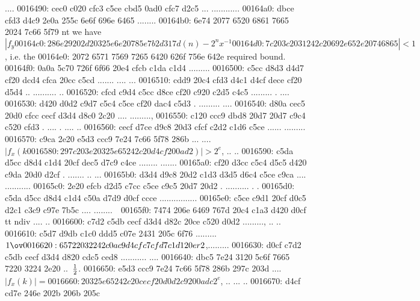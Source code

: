\begin{bo
00010e0: 7865 647d 5c62 6567 696e 7b76 6572 6261  xed}
\begin{verba
00010f0: 7469 6d7d 0a20 2023 7479 7065 2074 6572  tim}
\begin{
0001c40: 7665 7262 6174 696d 7d0a 2020 236c 6574  verbatim}
\begin{boxe
00027a0: 647d 5c62 6567 696e 7b76 6572 6261 7469  d}
\begin{verbati
00027b0: 6d7d 0a20 2023 6c65 7420 696e 6669 7865  m}
\begin{v
0002c60: 6572 6261 7469 6d7d 0a20 2023 6c65 7420  erbatim}
\begin{
0002dc0: 7665 7262 6174 696d 7d0a 2020 236c 6574  verbatim}
\begin{boxed
0002f30: 7d5c 6265 6769 6e7b 7665 7262 6174 696d  }
\begin{verbatim
0002f40: 7d0a 2020 236c 6574 2068 6428 683a 3a74  }
\begin{v
0003e60: 6572 6261 7469 6d7d 0a20 2023 236f 7065  erbatim}
\begin{boxed
00042b0: 7d5c 6265 6769 6e7b 7665 7262 6174 696d  }
\begin{verbatim
00042c0: 7d0a 2020 2328 782c 7429 3b3b 0a20 202d  }
\begin{box
000a870: 6564 7d5c 6265 6769 6e7b 6c73 746c 6973  ed}
\begin{lstlis
000a880: 7469 6e67 7d0a 2020 6578 6365 7074 696f  ting}
\begin{verb
000ade0: 6174 696d 7d0a 2020 6c65 7420 7265 6320  atim}
\begin{boxed
000c0b0: 7d5c 6265 6769 6e7b 6c73 746c 6973 7469  }
\begin{lstlisti
000c0c0: 6e67 7d0a 2020 6c65 7420 7061 7273 6572  ng}
\begin{lstl
0014610: 6973 7469 6e67 7d0a 2020 6c65 7420 7265  isting}
\begin{ls
0015df0: 746c 6973 7469 6e67 7d0a 2020 6c65 7420  tlisting}
....
0016490: cec0 c020 cfc3 c5ce cbd5 0ad0 cfc7 d2c5  ... ............
00164a0: dbce cfd3 d4c9 2e0a 255c 6e6f 696e 6465  ........%
00164b0: 6e74 2077 6520 6861 7665 2024 7c66 5f79  nt we have $|f_y
00164c0: 286e 2920 2d20 325e 6e20 785e 7b2d 317d  (n) - 2^n x^{-1}
00164d0: 7c20 3c20 3124 2c20 692e 652e 2074 6865  | < 1$, i.e. the
00164e0: 2072 6571 7569 7265 6420 626f 756e 642e   required bound.
00164f0: 0a0a 5c70 726f 6f66 20e4 cfcb c1da c1d4  ..\proof .......
0016500: c5cc d8d3 d4d7 cf20 dcd4 cfca 20cc c5cd  ....... .... ...
0016510: cdd9 20c4 cfd3 d4c1 d4cf dece cf20 d5d4  .. .......... ..
0016520: cfcd c9d4 c5cc d8ce cf20 c920 c2d5 c4c5  ......... . ....
0016530: d420 d0d2 c9d7 c5c4 c5ce cf20 dac4 c5d3  . ......... ....
0016540: d80a cec5 20d0 cfcc cecf d3d4 d8c0 2c20  .... ........., 
0016550: c120 ccc9 dbd8 20d7 20d7 c9c4 c520 cfd3  . .... . .... ..
0016560: cecf d7ce d9c8 20d3 cfcf c2d2 c1d6 c5ce  ...... .........
0016570: c9ca 2e20 e5d3 ccc9 7e24 7c66 5f78 286b  ... ....~$|f_x(k
0016580: 297c 203e 2032 5e65 242c 20d4 cf20 0ad2  )| > 2^e$, .. ..
0016590: c5da d5cc d8d4 c1d4 20cf dec5 d7c9 c4ce  ........ .......
00165a0: cf20 d3cc c5c4 d5c5 d420 c9da 20d0 d2cf  . ....... .. ...
00165b0: d3d4 d9c8 20d2 c1d3 d3d5 d6c4 c5ce c9ca  .... ...........
00165c0: 2e20 efcb d2d5 c7cc c5ce c9c5 20d7 20d2  . .......... . .
00165d0: c5da d5cc d8d4 c1d4 c50a d7d9 d0cf ccce  ................
00165e0: c5ce c9d1 20cf d0c5 d2c1 c3c9 c97e 7b5c  .... ........~{\
00165f0: 7474 206e 6469 767d 20c4 c1a3 d420 d0cf  tt ndiv} .... ..
0016600: c7d2 c5db cecf d3d4 d82c 20ce c520 d0d2  ........., .. ..
0016610: c5d7 d9db c1c0 ddd5 c07e 2431 205c 6f76  .........~$1 \ov
0016620: 6572 2032 242c 0ac9 d4cf c7cf d7c1 d120  er 2$,......... 
0016630: d0cf c7d2 c5db cecf d3d4 d820 cdc5 ced8  ........... ....
0016640: dbc5 7e24 3120 5c6f 7665 7220 3224 2e20  ..~$1 \over 2$. 
0016650: e5d3 ccc9 7e24 7c66 5f78 286b 297c 203d  ....~$|f_x(k)| =
0016660: 2032 5e65 242c 20ce cf20 d0d2 c920 0adc   2^e$, .. ... ..
0016670: d4cf cd7e 246e 202b 206b 205c 
\end{ls
0015df0: 746c 6973 7469 6e67 7d0a 2020 6c65 7420  tlisting}
\end{lstl
0014610: 6973 7469 6e67 7d0a 2020 6c65 7420 7265  isting}
\end{lstlisti
000c0c0: 6e67 7d0a 2020 6c65 7420 7061 7273 6572  ng}
\end{boxed
000c0b0: 7d5c 6265 6769 6e7b 6c73 746c 6973 7469  }
\end{verb
000ade0: 6174 696d 7d0a 2020 6c65 7420 7265 6320  atim}
\end{lstlis
000a880: 7469 6e67 7d0a 2020 6578 6365 7074 696f  ting}
\end{box
000a870: 6564 7d5c 6265 6769 6e7b 6c73 746c 6973  ed}
\end{verbatim
00042c0: 7d0a 2020 2328 782c 7429 3b3b 0a20 202d  }
\end{boxed
00042b0: 7d5c 6265 6769 6e7b 7665 7262 6174 696d  }
\end{v
0003e60: 6572 6261 7469 6d7d 0a20 2023 236f 7065  erbatim}
\end{verbatim
0002f40: 7d0a 2020 236c 6574 2068 6428 683a 3a74  }
\end{boxed
0002f30: 7d5c 6265 6769 6e7b 7665 7262 6174 696d  }
\end{
0002dc0: 7665 7262 6174 696d 7d0a 2020 236c 6574  verbatim}
\end{v
0002c60: 6572 6261 7469 6d7d 0a20 2023 6c65 7420  erbatim}
\end{verbati
00027b0: 6d7d 0a20 2023 6c65 7420 696e 6669 7865  m}
\end{boxe
00027a0: 647d 5c62 6567 696e 7b76 6572 6261 7469  d}
\end{
0001c40: 7665 7262 6174 696d 7d0a 2020 236c 6574  verbatim}
\end{verba
00010f0: 7469 6d7d 0a20 2023 7479 7065 2074 6572  tim}
\end{bo
00010e0: 7865 647d 5c62 6567 696e 7b76 6572 6261  xed}
